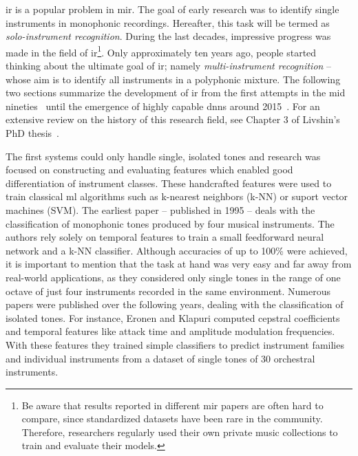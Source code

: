 \Gls{ir} is a popular problem in \gls{mir}. The goal of early research was to identify single instruments in monophonic recordings. Hereafter, this task will be termed as \textit{solo-instrument recognition}. During the last decades, impressive progress was made in the field of \gls{ir}\footnote{Be aware that results reported in different \gls{mir} papers are often hard to compare, since standardized datasets have been rare in the community. Therefore, researchers regularly used their own private music collections to train and evaluate their models.}. Only approximately ten years ago, people started thinking about the ultimate goal of \gls{ir}; namely \textit{multi-instrument recognition} -- whose aim is to identify all instruments in a polyphonic mixture. The following two sections summarize the development of \gls{ir} from the first attempts in the mid nineties~\cite{kaminsky1995automatic} until the emergence of highly capable \glspl{dnn} around 2015~\cite{li2015automatic}. For an extensive review on the history of this research field, see Chapter 3 of Livshin's PhD thesis~\cite{livshin2007automatic}.

The first systems could only handle single, isolated tones and research was focused on constructing and evaluating features which enabled good differentiation of instrument classes. These handcrafted features were used to train classical \gls{ml} algorithms such as k-nearest neighbors (k-NN) or suport vector machines (SVM). The earliest paper \cite{kaminsky1995automatic} -- published in 1995 -- deals with the classification of monophonic tones produced by four musical instruments. The authors rely solely on temporal features to train a small feedforward neural network and a k-NN classifier. Although accuracies of up to 100\% were achieved, it is important to mention that the task at hand was very easy and far away from real-world applications, as they considered only single tones in the range of one octave of just four instruments recorded in the same environment. Numerous papers were published over the following years, dealing with the classification of isolated tones. For instance, Eronen and Klapuri \cite{eronen2000musical} computed cepstral coefficients and temporal features like attack time and amplitude modulation frequencies. With these features they trained simple classifiers to predict instrument families and individual instruments from a dataset of single tones of 30 orchestral instruments.\\

